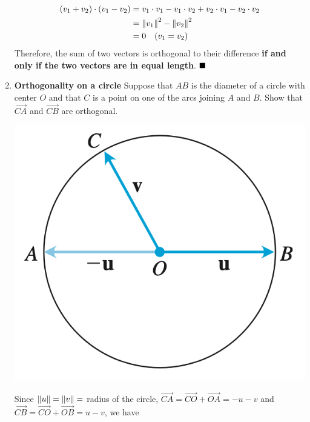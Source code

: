 \begin{enumerate}
          \sol{}
          \begin{align*}
              (v_1 + v_2) \cdot (v_1 - v_2) & = v_1 \cdot v_1 - v_1 \cdot v_2 + v_2 \cdot v_1 - v_2 \cdot v_2 \\
                                            & = \left\lVert v_1\right\rVert^2 - \left\lVert v_2\right\rVert^2                                   \\
                                            & = 0 \quad (v_1 = v_2)
          \end{align*}
          Therefore, the sum of two vectors is orthogonal to their difference \textbf{if and only if the two vectors are in equal length}. $\hfill\blacksquare$

          \newpage
    \item \textbf{Orthogonality on a circle} Suppose that $A B$ is the diameter of a circle with
          center $O$ and that $C$ is a point on one of the arcs joining $A$ and $B$. Show
          that $\overrightarrow{C A}$ and $\overrightarrow{C B}$ are orthogonal.
          \begin{center}
              \includegraphics[scale=0.4]{./assets/thomas12.3q20.png}
          \end{center}
          \sol{} Since $\left\lVert u\right\rVert = \left\lVert v\right\rVert = $ radius of the circle, $\overrightarrow{C A} = \overrightarrow{CO} + \overrightarrow{OA} = -u - v$ and $\overrightarrow{C B} = \overrightarrow{CO} + \overrightarrow{OB} = u - v$, we have
          \begin{align*}

\end{align*}
\end{enumerate}
